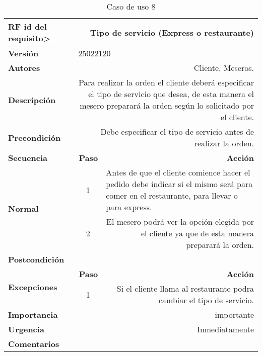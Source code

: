 \documentclass[conference]{IEEEtran}
\begin{document}
\begin{table}[H]
  \centering
   \begin{adjustbox}{width=0.47\textwidth}
    \begin{tabular}{|p{11.215em}|r|r|}
    \toprule
    \textbf{RF id del requisito>} & \multicolumn{2}{p{37.355em}|}{\textbf{Tipo de servicio (Express o restaurante)}} \\
    \midrule
    \textbf{Versión} & \multicolumn{2}{l|}{25022120} \\
    \midrule
    \textbf{Autores} & \multicolumn{2}{p{37.355em}|}{Cliente, Meseros.} \\
    \midrule
    \textbf{Descripción} & \multicolumn{2}{p{37.355em}|}{Para realizar la orden el cliente deberá especificar el tipo de servicio que desea, de esta manera el mesero preparará la orden según lo solicitado por el cliente.} \\
    \midrule
    \textbf{Precondición} & \multicolumn{2}{p{37.355em}|}{Debe especificar el tipo de servicio antes de realizar la orden.} \\
    \midrule
    \textbf{Secuencia} & \multicolumn{1}{p{5.355em}|}{\textbf{Paso}} & \multicolumn{1}{p{32em}|}{\textbf{Acción}} \\
    \midrule
    \multirow{3}[4]{*}{\textbf{Normal}} & \multicolumn{1}{c|}{\multirow{2}[2]{*}{1}} & \multicolumn{1}{l|}{\multirow{2}[2]{*}{Antes de que el cliente comience hacer el pedido debe indicar si el mismo será para comer en el restaurante, para llevar o para express.}} \\
    \multicolumn{1}{|c|}{} & \multicolumn{1}{c|}{} &  \\
\cmidrule{2-3}    \multicolumn{1}{|c|}{} & \multicolumn{1}{c|}{2} & \multicolumn{1}{p{32em}|}{El mesero podrá ver la opción elegida por el cliente ya que de esta manera preparará la orden.} \\
    \midrule
    \textbf{Postcondición} & \multicolumn{2}{r|}{} \\
    \midrule
    \multirow{2}[4]{*}{\textbf{Excepciones}} & \multicolumn{1}{p{5.355em}|}{\textbf{Paso}} & \multicolumn{1}{p{32em}|}{\textbf{Acción}} \\
\cmidrule{2-3}    \multicolumn{1}{|c|}{} & \multicolumn{1}{c|}{1} & \multicolumn{1}{p{32em}|}{Si el cliente llama al restaurante podra cambiar el tipo de servicio.} \\
    \midrule
    \textbf{Importancia} & \multicolumn{2}{p{37.355em}|}{importante } \\
    \midrule
    \textbf{Urgencia} & \multicolumn{2}{p{37.355em}|}{Inmediatamente} \\
    \midrule
    \textbf{Comentarios} & \multicolumn{2}{r|}{} \\
    \bottomrule
    \end{tabular}%
    \end{adjustbox}
    \vspace{0.3cm}
    \caption{Caso de uso 8}
  \label{tab:addlabel}%
\end{table}%
\end{document}

